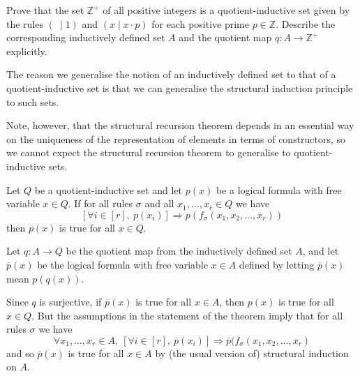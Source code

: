 \begin{exercise}
Prove that the set $\mathbb{Z}^+$ of all positive integers is a quotient-inductive set given by the rules $(~ \mid 1)$ and $(x \mid x \cdot p)$ for each positive prime $p \in \mathbb{Z}$. Describe the corresponding inductively defined set $A$ and the quotient map $q : A \to \mathbb{Z}^+$ explicitly.
\end{exercise}

The reason we generalise the notion of an inductively defined set to that of a quotient-inductive set is that we can generalise the structural induction principle to such sets.

Note, however, that the structural recursion theorem depends in an essential way on the uniqueness of the representation of elements in terms of constructors, so we cannot expect the structural recursion theorem to generalise to quotient-inductive sets.

\begin{theorem}
\label{thmStructuralInductionForQuotientInductiveSets}
Let $Q$ be a quotient-inductive set and let $p(x)$ be a logical formula with free variable $x \in Q$. If for all rules $\sigma$ and all $x_1,\dots,x_r \in Q$ we have
\[ [\forall i \in [r],~ p(x_i)] \Rightarrow p(f_{\sigma}(x_1,x_2,\dots,x_r)) \]
then $p(x)$ is true for all $x \in Q$.
\end{theorem}

\begin{cproof}
Let $q : A \to Q$ be the quotient map from the inductively defined set $A$, and let $\overline{p}(x)$ be the logical formula with free variable $x \in A$ defined by letting $\overline{p}(x)$ mean $p(q(x))$.

Since $q$ is surjective, if $\overline{p}(x)$ is true for all $x \in A$, then $p(x)$ is true for all $x \in Q$. But the assumptions in the statement of the theorem imply that for all rules $\sigma$ we have
\[ \forall x_1,\dots,x_r \in A,~ [\forall i \in [r],~ \overline{p}(x_i)] \Rightarrow \overline{p}(f_{\sigma}(x_1,x_2,\dots,x_r) \]
and so $\overline{p}(x)$ is true for all $x \in A$ by (the usual version of) structural induction on $A$.
\end{cproof}

